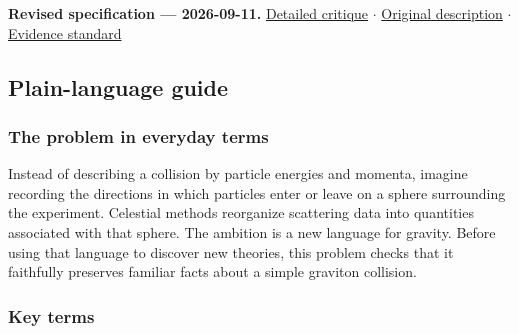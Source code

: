 \documentclass[
  11pt,
]{article}
\begin{document}
\textbf{Revised specification --- 2026-09-11.}
\href{https://github.com/rick-stevens-ai/Pure-Thought/blob/main/reviews/03-Celestial-CFT-Bootstrap.md}{Detailed
critique} \ensuremath{\cdot}
\href{https://github.com/rick-stevens-ai/Pure-Thought/blob/main/archive/original-PRDs/03-Celestial-CFT-Bootstrap.md}{Original
description} \ensuremath{\cdot}
\href{https://github.com/rick-stevens-ai/Pure-Thought/blob/main/reviews/EVIDENCE-STANDARD.md}{Evidence
standard}

\subsection{Plain-language guide}

\subsubsection{The problem in everyday terms}

Instead of describing a collision by particle energies and momenta,
imagine recording the directions in which particles enter or leave on a
sphere surrounding the experiment. Celestial methods reorganize
scattering data into quantities associated with that sphere. The
ambition is a new language for gravity. Before using that language to
discover new theories, this problem checks that it faithfully preserves
familiar facts about a simple graviton collision.

\subsubsection{Key terms}
\end{document}

